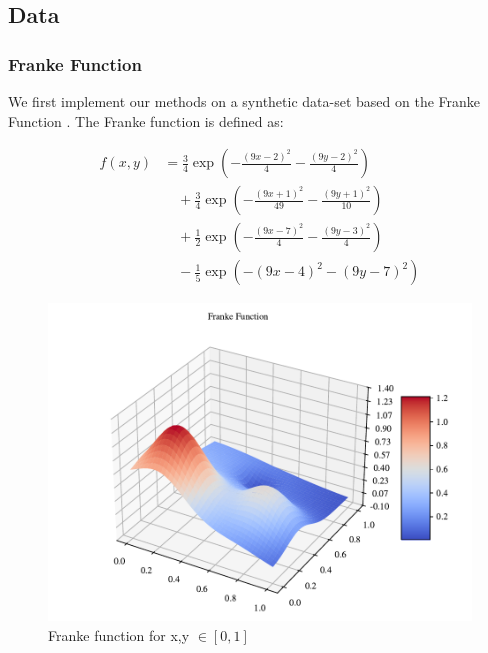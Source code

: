 \subsection{Data}

\subsubsection{Franke Function}
We first implement our methods on a synthetic data-set based on the Franke Function \cite{frank}.
The Franke function is defined as:

\begin{align}
    f(x, y) &= \frac{3}{4} \exp\left( -\frac{(9x - 2)^2}{4} - \frac{(9y - 2)^2}{4} \right) \nonumber \\
    &\quad + \frac{3}{4} \exp\left( -\frac{(9x + 1)^2}{49} - \frac{(9y + 1)^2}{10} \right) \nonumber \\
    &\quad + \frac{1}{2} \exp\left( -\frac{(9x - 7)^2}{4} - \frac{(9y - 3)^2}{4} \right) \nonumber \\
    &\quad - \frac{1}{5} \exp\left( -(9x - 4)^2 - (9y - 7)^2 \right)
\end{align}


\begin{figure}[h!]
\centering
\includegraphics[width=1\linewidth]{project_1_alt/figures/data/franke_func.pdf}
\caption{Franke function for x,y $\in [0,1]$}
\label{franke}
\end{figure}

